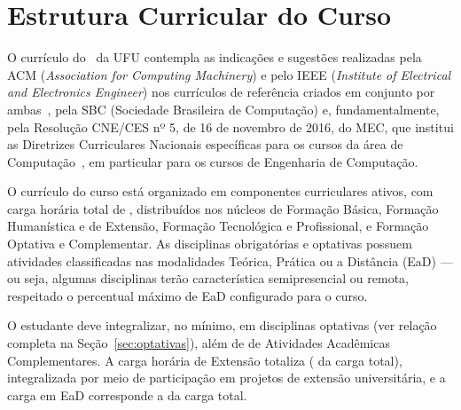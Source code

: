 \chapter{Estrutura Curricular do Curso}

O currículo do \ppccurso\ da UFU contempla as indicações e sugestões realizadas pela ACM (\textit{Association for Computing Machinery}) e pelo IEEE (\textit{Institute of Electrical and Electronics Engineer}) nos currículos de referência criados em conjunto por ambas~\cite{ACM:CC2020}, pela SBC (Sociedade Brasileira de Computação) e, fundamentalmente, pela Resolução CNE/CES nº 5, de 16 de novembro de 2016, do MEC, que institui as Diretrizes Curriculares Nacionais específicas para os cursos da área de Computação~\cite{MEC:CNE:CES:5:2016}, em particular para os cursos de Engenharia de Computação.

O currículo do curso está organizado em  componentes curriculares ativos, com carga horária total de \textbf{}, distribuídos nos núcleos de Formação Básica, Formação Humanística e de Extensão, Formação Tecnológica e Profissional, e Formação Optativa e Complementar. As disciplinas obrigatórias e optativas possuem atividades classificadas nas modalidades Teórica, Prática ou a Distância (EaD) — ou seja, algumas disciplinas terão característica semipresencial ou remota, respeitado o percentual máximo de EaD configurado para o curso.

O estudante deve integralizar, no mínimo, \textbf{} em disciplinas optativas (ver relação completa na Seção~\ref{sec:optativas}), além de \textbf{} de Atividades Acadêmicas Complementares. A carga horária de Extensão totaliza \textbf{} ( da carga total), integralizada por meio de participação em projetos de extensão universitária, e a carga em EaD corresponde a  da carga total.

